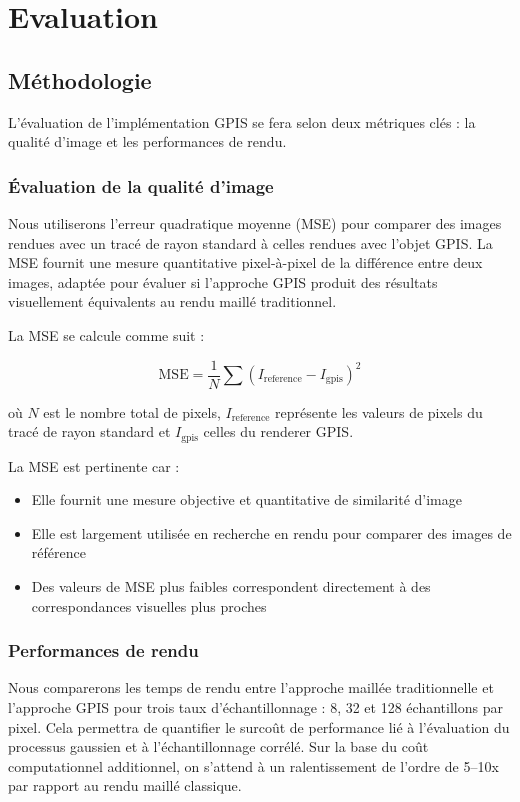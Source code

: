 \section{Evaluation}

\subsection{Méthodologie}

L'évaluation de l'implémentation GPIS se fera selon deux métriques clés : la qualité d'image et les performances de rendu.

\subsubsection{Évaluation de la qualité d'image}

Nous utiliserons l'erreur quadratique moyenne (MSE) pour comparer des images rendues avec un tracé de rayon standard à celles rendues avec l'objet GPIS. La MSE fournit une mesure quantitative pixel-à-pixel de la différence entre deux images, adaptée pour évaluer si l'approche GPIS produit des résultats visuellement équivalents au rendu maillé traditionnel.

La MSE se calcule comme suit :

\begin{equation}
\text{MSE} = \frac{1}{N} \sum (I_{\text{reference}} - I_{\text{gpis}})^2
\end{equation}

où $N$ est le nombre total de pixels, $I_{\text{reference}}$ représente les valeurs de pixels du tracé de rayon standard et $I_{\text{gpis}}$ celles du renderer GPIS.

La MSE est pertinente car :

\begin{itemize}[noitemsep]
    \item Elle fournit une mesure objective et quantitative de similarité d'image
    \item Elle est largement utilisée en recherche en rendu pour comparer des images de référence
    \item Des valeurs de MSE plus faibles correspondent directement à des correspondances visuelles plus proches
\end{itemize}

\subsubsection{Performances de rendu}

Nous comparerons les temps de rendu entre l'approche maillée traditionnelle et l'approche GPIS pour trois taux d'échantillonnage : 8, 32 et 128 échantillons par pixel. Cela permettra de quantifier le surcoût de performance lié à l'évaluation du processus gaussien et à l'échantillonnage corrélé. Sur la base du coût computationnel additionnel, on s'attend à un ralentissement de l'ordre de 5–10x par rapport au rendu maillé classique.
